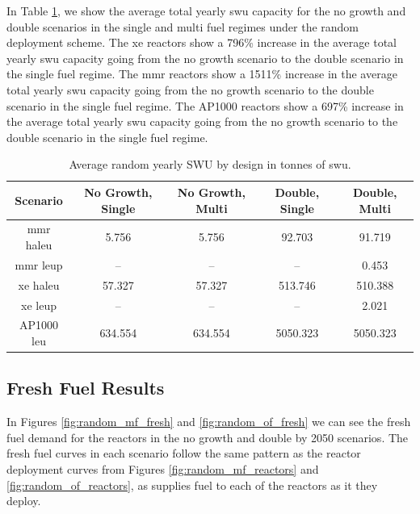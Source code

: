 In Table \ref{tab:random_swu_avg}, we show the average total yearly \gls{swu} capacity for the no growth and double scenarios in the single and multi fuel regimes under the random deployment scheme. The \gls{xe} reactors show a 796\% increase in the average total yearly \gls{swu} capacity going from the no growth scenario to the double scenario in the single fuel regime. The \gls{mmr} reactors show a 1511\% increase in the average total yearly \gls{swu} capacity going from the no growth scenario to the double scenario in the single fuel regime. The AP1000 reactors show a 697\% increase in the average total yearly \gls{swu} capacity going from the no growth scenario to the double scenario in the single fuel regime.

\begin{table}[H]
    \centering
    \caption{Average random yearly SWU by design in tonnes of \gls{swu}.}
    \label{tab:random_swu_avg}
    \begin{tabular}{c c c c c}
       \hline
       Scenario & No Growth, Single & No Growth, Multi & Double, Single & Double, Multi  \\
       \hline
       \gls{mmr} \gls{haleu}   & 5.756   & 5.756   & 92.703    & 91.719   \\
       \gls{mmr} \gls{leup}    & --      & --      & --       & 0.453    \\
       \gls{xe} \gls{haleu}    & 57.327  & 57.327  & 513.746  & 510.388  \\
       \gls{xe} \gls{leup}     & --      & --      & --       & 2.021    \\
       AP1000 \gls{leu}        & 634.554 & 634.554 & 5050.323 & 5050.323 \\
       \hline
    \end{tabular}
\end{table}





\subsection{Fresh Fuel Results}
\label{sec:random_fresh}

In Figures \ref{fig:random_mf_fresh} and \ref{fig:random_of_fresh} we can see the fresh fuel demand for the reactors in the no growth and double by 2050 scenarios. The fresh fuel curves in each scenario follow the same pattern as the reactor deployment curves from Figures \ref{fig:random_mf_reactors} and \ref{fig:random_of_reactors}, as \cyclus supplies fuel to each of the reactors as it they deploy.

